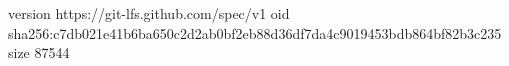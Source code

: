 version https://git-lfs.github.com/spec/v1
oid sha256:c7db021e41b6ba650c2d2ab0bf2eb88d36df7da4c9019453bdb864bf82b3c235
size 87544
